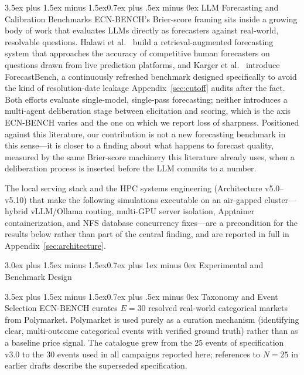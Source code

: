 \documentclass[11pt,journal,onecolumn]{IEEEtran}
\makeatletter
\renewcommand\section{\@startsection{section}{1}{\z@}%
  {3.0ex plus 1.5ex minus 1.5ex}{0.7ex plus 1ex minus 0ex}%
  {\normalfont\normalsize\centering\bfseries}}
\renewcommand\subsection{\@startsection{subsection}{2}{\z@}%
  {3.5ex plus 1.5ex minus 1.5ex}{0.7ex plus .5ex minus 0ex}%
  {\normalfont\normalsize\bfseries}}
\makeatother
\begin{document}
\subsection{LLM Forecasting and Calibration Benchmarks}
\label{sec:related_forecasting}
ECN-BENCH's Brier-score framing sits inside a growing body of work that evaluates LLMs directly as forecasters against real-world, resolvable questions. Halawi et al.~\cite{halawi2024approaching} build a retrieval-augmented forecasting system that approaches the accuracy of competitive human forecasters on questions drawn from live prediction platforms, and Karger et al.~\cite{karger2024forecastbench} introduce ForecastBench, a continuously refreshed benchmark designed specifically to avoid the kind of resolution-date leakage Appendix~\ref{sec:cutoff} audits after the fact. Both efforts evaluate single-model, single-pass forecasting; neither introduces a multi-agent deliberation stage between elicitation and scoring, which is the axis ECN-BENCH varies and the one on which we report loss of sharpness. Positioned against this literature, our contribution is not a new forecasting benchmark in this sense---it is closer to a finding about what happens to forecast quality, measured by the same Brier-score machinery this literature already uses, when a deliberation process is inserted before the LLM commits to a number.

The local serving stack and the HPC systems engineering (Architecture v5.0--v5.10) that make the following simulations executable on an air-gapped cluster---hybrid vLLM/Ollama routing, multi-GPU server isolation, Apptainer containerization, and NFS database concurrency fixes---are a precondition for the results below rather than part of the central finding, and are reported in full in Appendix~\ref{sec:architecture}.

\section{Experimental and Benchmark Design}
\label{sec:design}

\subsection{Taxonomy and Event Selection}
\label{sec:taxonomy}
ECN-BENCH curates $E=30$ resolved real-world categorical markets from Polymarket. Polymarket is used purely as a curation mechanism (identifying clear, multi-outcome categorical events with verified ground truth) rather than as a baseline price signal. The catalogue grew from the 25 events of specification v3.0 to the 30 events used in all campaigns reported here; references to $N=25$ in earlier drafts describe the superseded specification.
\end{document}
